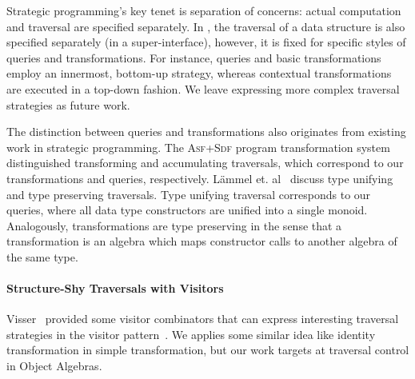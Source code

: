 Strategic programming's key tenet is separation of concerns:  actual computation and traversal are specified separately.
In \name, the traversal of a data structure is also specified separately (in a super-interface), however, it is fixed for specific styles of queries and transformations.
For instance, queries and basic transformations employ an innermost, bottom-up strategy, whereas contextual transformations are executed in a top-down fashion.
We leave expressing more complex traversal strategies as future work. 

The distinction between queries and transformations also originates from existing work in strategic programming. The \textsc{Asf+Sdf} program transformation system distinguished transforming and accumulating traversals, which correspond to our transformations and queries, respectively.
L\"ammel et. al~\cite{lammel2002typed} discuss type unifying and type preserving traversals.
Type unifying traversal corresponds to our queries, where all data type constructors are unified into a single monoid.
Analogously, \name transformations are type preserving in the sense that a transformation is an algebra which maps constructor calls to another algebra of the same type.


\paragraph{Structure-Shy Traversals with Visitors}
Visser~\cite{visser01visitor} provided some visitor
combinators that can express interesting traversal strategies in the
{\sc visitor} pattern~\cite{gof}. We applies some similar idea like identity
transformation in simple transformation, but our work targets at
traversal control in Object Algebras.

\cite{palsberg98essence}

\cite{bravenboer2001guiding}






